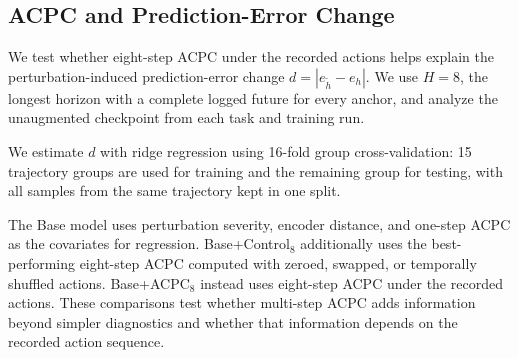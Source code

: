 \documentclass{article}
\begin{document}



\subsection{ACPC and Prediction-Error Change}
\label{sec:exp-target-aligned}

We test whether eight-step ACPC under the recorded actions helps explain the
perturbation-induced prediction-error change $d=|e_{\tilde h}-e_h|$.
We use $H=8$, the longest horizon with a complete logged future for every
anchor, and analyze the unaugmented checkpoint from each task and training
run.

We estimate $d$ with ridge regression using 16-fold group cross-validation:
15 trajectory groups are used for training and the remaining group for testing,
with all samples from the same trajectory kept in one split.

The Base model uses perturbation severity, encoder distance, and one-step ACPC as the covariates for regression.
Base+Control$_8$ additionally uses the best-performing eight-step ACPC computed
with zeroed, swapped, or temporally shuffled actions. Base+ACPC$_8$ instead
uses eight-step ACPC under the recorded actions. These comparisons test whether
multi-step ACPC adds information beyond simpler diagnostics and whether that
information depends on the recorded action sequence.
\end{document}
